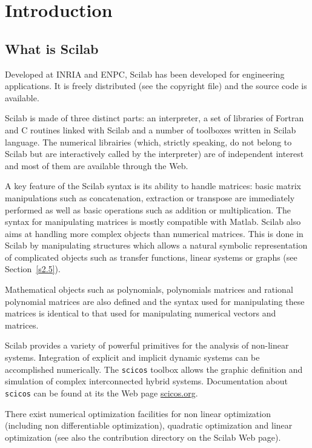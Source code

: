 
\chapter{Introduction}

\section{What is Scilab}

Developed at INRIA and ENPC, Scilab has been developed for engineering 
applications. It is freely distributed (see the copyright file) and the source
code is available.

Scilab is made of three distinct parts: an interpreter, 
a set of libraries of Fortran and C routines linked with Scilab
and a number of toolboxes written in Scilab language.
The numerical librairies (which, strictly speaking, do not belong to Scilab but
are interactively called by the interpreter) are of 
independent interest and most of them are available through the Web. 
 
A key feature of the Scilab syntax is its ability to handle matrices: 
basic matrix manipulations such as concatenation, 
extraction or transpose are immediately performed as well as basic operations
such as addition or multiplication. The syntax for manipulating
matrices is mostly compatible with Matlab. 
Scilab also aims at handling more complex
objects than numerical matrices. This is
done in Scilab by manipulating structures which allows a 
natural symbolic representation of complicated
objects such as transfer functions, linear systems or graphs
(see Section~\ref{s2.5}).

 Mathematical objects such as polynomials, polynomials matrices 
and rational polynomial matrices are also defined and the syntax 
used for manipulating these matrices is identical to that used for 
manipulating numerical vectors and matrices.

        Scilab provides a variety of powerful primitives for
the analysis of non-linear systems.  
Integration of explicit and implicit dynamic systems can be accomplished 
numerically.  The {\tt scicos} toolbox allows the graphic definition
and simulation of complex interconnected hybrid systems. Documentation
about {\tt scicos} can be found at its the Web page 
\href{http://www.scicos.org}{scicos.org}.

 There exist numerical optimization facilities for non linear 
optimization (including non differentiable optimization), quadratic 
optimization and linear optimization (see also the contribution 
directory on the Scilab Web page).

